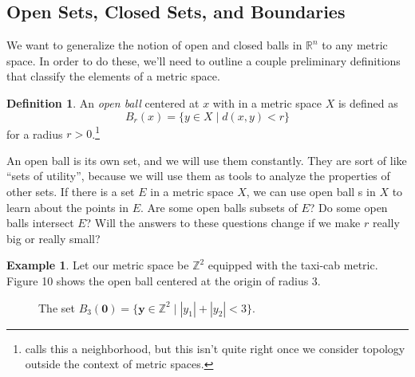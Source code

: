 \documentclass{article}
\newcommand{\R}{\mathbb{R}}
\newcommand{\y}{\mathbf{y}}
\newcommand{\Z}{\mathbb{Z}}
\theoremstyle{definition}
\newtheorem{definition}{Definition}[section]
\newtheorem{example}{Example}[section]
\begin{document}
	\subsection{Open Sets, Closed Sets, and Boundaries}
	We want to generalize the notion of open and closed balls in $ \R^n $ to any metric space. In order to do these, we'll need to outline a couple preliminary definitions that classify the elements of a metric space. 
	\begin{definition}\label{def2.5}
		An \textit{\color{red}open ball} centered at $ x $ with in a metric space $ X $ is defined as $$ B_r(x)=\{y\in X\mid d(x,y)<r\} $$ for a radius $ r>0 $.\footnote{ \cite{rudin1964principles} calls this a neighborhood, but this isn't quite right once we consider topology outside the context of metric spaces.}   
	\end{definition}
	An  open ball is its own set, and we will use them constantly. They are sort of like ``sets of utility'', because we will use them as tools to analyze the properties of other sets. If there is a set $ E $ in a metric space $ X $, we can use open ball s in $ X $ to learn about the points in $ E $. Are some open balls subsets of $ E $? Do some open balls intersect $ E $? Will the answers to these questions change if we make $ r $ really big or really small? 
	\begin{example}
		Let our metric space be $ \Z^2 $ equipped with the taxi-cab metric. Figure 10 shows the open ball centered at the origin of radius 3. 
		\begin{figure}[h]
			\centering
			\caption{The set $ B_{3}(\mathbf{0})=\{\y\in\Z^2\mid|y_1|+|y_2|<3 \} $.}
		\end{figure}
	\end{example} 
	
\end{document}
